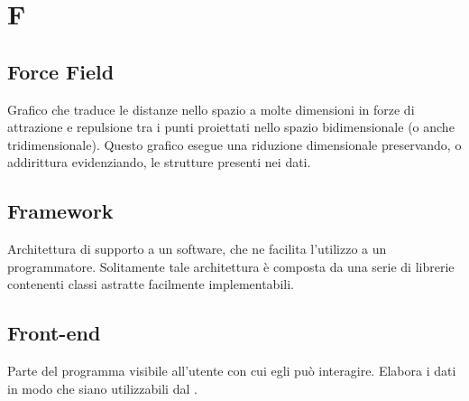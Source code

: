 \section*{F}
\markright{}
\subsection*{Force Field}
Grafico che traduce le distanze nello spazio a molte dimensioni in forze di attrazione e repulsione tra i punti proiettati nello spazio bidimensionale (o anche tridimensionale). Questo grafico esegue una riduzione dimensionale preservando, o addirittura evidenziando, le strutture presenti nei dati.

\subsection*{Framework}
Architettura di supporto a un software, che ne facilita l'utilizzo a un programmatore. Solitamente tale architettura è composta da una serie di librerie contenenti classi astratte facilmente implementabili. 

\subsection*{Front-end}
Parte del programma visibile all'utente con cui egli può interagire. Elabora i dati in modo che siano utilizzabili dal .